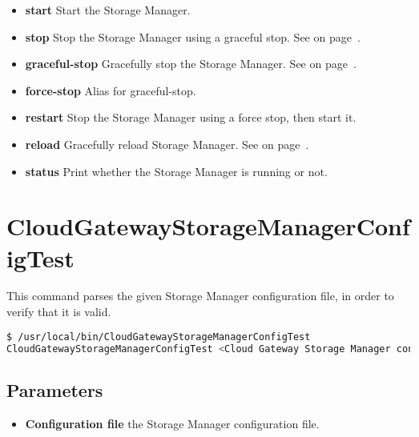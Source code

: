 \documentclass[11pt,fleqn,openany]{book} %
\begin{document}
\begin{itemize}
\item \textbf{start} Start the Storage Manager.

\item \textbf{stop} Stop the Storage Manager using a graceful stop. See  on page~\pageref{sec:graceful-stop-and-force-stop}.

\item \textbf{graceful-stop} Gracefully stop the Storage Manager. See  on page~\pageref{sec:graceful-stop-and-force-stop}.

\item \textbf{force-stop} Alias for graceful-stop.

\item \textbf{restart} Stop the Storage Manager using a force stop, then start it.

\item \textbf{reload} Gracefully reload Storage Manager. See  on page~\pageref{sec:graceful-reload}.

\item \textbf{status} Print whether the Storage Manager is running or not.

\end{itemize}

\clearpage

\section*{CloudGatewayStorageManagerConfigTest}
\label{sec:cloudgatewaystoragemanagerconfigtest}

This command parses the given Storage Manager configuration file, in order to verify that it is valid.

\begin{lstlisting}[language=bash]
$ /usr/local/bin/CloudGatewayStorageManagerConfigTest
CloudGatewayStorageManagerConfigTest <Cloud Gateway Storage Manager configuration file>
\end{lstlisting}

\subsection*{Parameters}

\begin{itemize}

\item \textbf{Configuration file} the Storage Manager configuration file.

\end{itemize}
\end{document}
